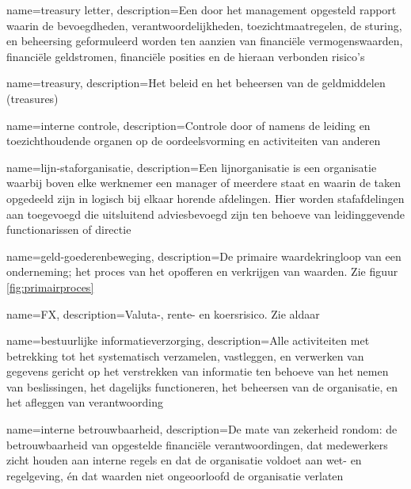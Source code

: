 
\makeglossaries

{
    name=treasury letter,
    description={Een door het management opgesteld rapport waarin de bevoegdheden, verantwoordelijkheden, toezichtmaatregelen, de sturing, en beheersing geformuleerd worden ten aanzien van financiële vermogenswaarden, financiële geldstromen, financiële posities en de hieraan verbonden risico’s}
}

{
    name=treasury,
    description={Het beleid en het beheersen van de geldmiddelen (treasures)}
}

{
    name=interne controle,
    description={Controle door of namens de leiding en toezichthoudende organen op de oordeelsvorming en activiteiten van anderen}
}

{
    name=lijn-staforganisatie,
    description={Een lijnorganisatie is een organisatie waarbij boven elke werknemer een manager of meerdere staat en waarin de taken opgedeeld zijn in logisch bij elkaar horende afdelingen. Hier worden stafafdelingen aan toegevoegd die uitsluitend adviesbevoegd zijn ten behoeve van leidinggevende functionarissen of directie}
}

{
    name=geld-goederenbeweging,
    description={De primaire waardekringloop van een onderneming; het proces van het opofferen en verkrijgen van waarden. Zie figuur \ref{fig:primairproces}}
}

{
    name=FX,
    description={Valuta-, rente- en koersrisico. Zie aldaar}
}

{
    name=bestuurlijke informatieverzorging,
    description={Alle activiteiten met betrekking tot het systematisch verzamelen, vastleggen, en verwerken van gegevens gericht op het verstrekken van informatie ten behoeve van het nemen van beslissingen, het dagelijks functioneren, het beheersen van de organisatie, en het afleggen van verantwoording}
}

{
    name=interne betrouwbaarheid,
    description={De mate van zekerheid rondom: de betrouwbaarheid van opgestelde financiële verantwoordingen, dat medewerkers zicht houden aan interne regels en dat de organisatie voldoet aan wet- en regelgeving, én dat waarden niet ongeoorloofd de organisatie verlaten}
}

